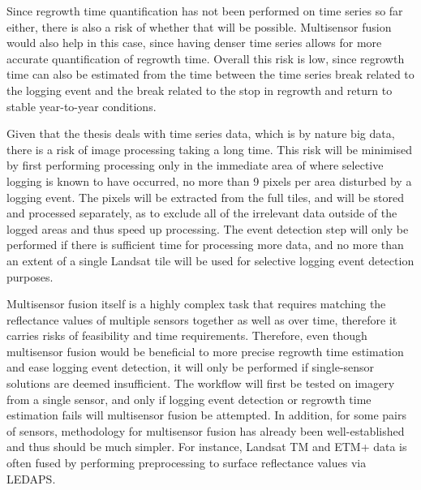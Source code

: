 \documentclass[a4paper,10pt]{article}
\begin{document}
Since regrowth time quantification has not been performed on time series so far either, there is also a risk of whether that will be possible. Multisensor fusion would also help in this case, since having denser time series allows for more accurate quantification of regrowth time. Overall this risk is low, since regrowth time can also be estimated from the time between the time series break related to the logging event and the break related to the stop in regrowth and return to stable year-to-year conditions.

Given that the thesis deals with time series data, which is by nature big data, there is a risk of image processing taking a long time. This risk will be minimised by first performing processing only in the immediate area of where selective logging is known to have occurred, no more than 9 pixels per area disturbed by a logging event. The pixels will be extracted from the full tiles, and will be stored and processed separately, as to exclude all of the irrelevant data outside of the logged areas and thus speed up processing. The event detection step will only be performed if there is sufficient time for processing more data, and no more than an extent of a single Landsat tile will be used for selective logging event detection purposes.

Multisensor fusion itself is a highly complex task that requires matching the reflectance values of multiple sensors together as well as over time, therefore it carries risks of feasibility and time requirements. Therefore, even though multisensor fusion would be beneficial to more precise regrowth time estimation and ease logging event detection, it will only be performed if single-sensor solutions are deemed insufficient. The workflow will first be tested on imagery from a single sensor, and only if logging event detection or regrowth time estimation fails will multisensor fusion be attempted. In addition, for some pairs of sensors, methodology for multisensor fusion has already been well-established and thus should be much simpler. For instance, Landsat TM and ETM+ data is often fused by performing preprocessing to surface reflectance values via LEDAPS.


\end{document}
